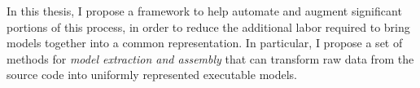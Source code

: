 In this thesis, I propose a framework to help automate and augment significant portions of this process, in order to reduce the additional labor required to bring models together into a common representation.
In particular, I propose a set of methods for \textit{model extraction and assembly} that can transform raw data from the source code into uniformly represented executable models.


